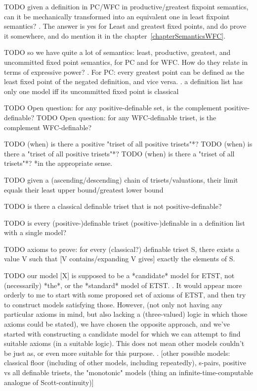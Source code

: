 \documentclass[oneside,12pt]{book}
\newcounter{question}
\theoremstyle{definition}
\theoremstyle{remark}
\begin{document}
TODO given a definition in PC/WFC in productive/greatest fixpoint semantics,
can it be mechanically transformed into an equivalent one in least fixpoint semantics?
.
The answer is yes for Least and greatest fixed points, and do prove it somewhere,
and do mention it in the chapter~\ref{chapterSemanticsWFC}.

TODO so we have quite a lot of semantics: least, productive, greatest, and uncommitted
fixed point semantics, for PC and for WFC. How do they relate in terms of expressive power?
.
For PC: every greatest point can be defined as the least fixed point of the negated
definition, and vice versa.
.
a definition list has only one model iff its uncommitted fixed point is classical

TODO Open question: for any positive-definable set, is the complement positive-definable?
TODO Open question: for any WFC-definable triset, is the complement WFC-definable?

TODO (when) is there a positive "triset of all positive trisets"*?
TODO (when) is there a "triset of all positive trisets"*?
TODO (when) is there a "triset of all trisets"*?
*in the appropriate sense.

TODO given a (ascending/descending) chain of trisets/valuations, their limit equals
their least upper bound/greatest lower bound

TODO is there a classical definable triset that is not positive-definable?

TODO is every (positive-)definable triset (positive-)definable in a definition list
with a single model?

TODO axioms to prove: for every (classical?) definable triset S, there exists
a value V such that [V contains/expanding V gives] exactly the elements of S.

TODO our model [X] is supposed to be a *candidate* model for ETST, not
(necessarily) *the*, or the *standard* model of ETST.
.
It would appear more orderly to me to start with some proposed set
of axioms of ETST, and then try to construct models satisfying those.
However, (not only not having any particular axioms in mind, but also lacking
a (three-valued) logic in which those axioms could be stated), we have chosen
the opposite approach, and we've started with constructing a candidate model for
which we can attempt to find suitable axioms (in a suitable logic). This does
not mean other models couldn't be just as, or even more suitable for this purpose.
.
[other possible models: classical floor (including of other models, including
repeatedly), s-pairs, positive vs all definable trisets, the "monotonic" models
(thing an infinite-time-computable analogue of Scott-continuity)]
\end{document}

